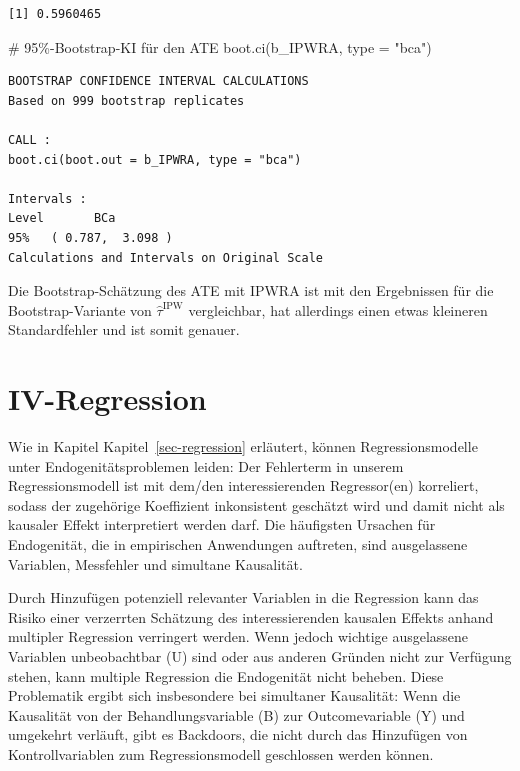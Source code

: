 \documentclass[
  a4paper,
  DIV=11,
  oneside]{scrreprt}
\newenvironment{Shaded}{\begin{snugshade}}{\end{snugshade}}
\newcommand{\AttributeTok}[1]{\textcolor[rgb]{0.40,0.45,0.13}{#1}}
\newcommand{\CommentTok}[1]{\textcolor[rgb]{0.37,0.37,0.37}{#1}}
\newcommand{\FunctionTok}[1]{\textcolor[rgb]{0.28,0.35,0.67}{#1}}
\newcommand{\NormalTok}[1]{\textcolor[rgb]{0.00,0.23,0.31}{#1}}
\newcommand{\StringTok}[1]{\textcolor[rgb]{0.13,0.47,0.30}{#1}}
\begin{document}
\begin{verbatim}
[1] 0.5960465
\end{verbatim}

\begin{Shaded}
\begin{Highlighting}[]
\CommentTok{\# 95\%{-}Bootstrap{-}KI für den ATE}
\FunctionTok{boot.ci}\NormalTok{(b\_IPWRA, }\AttributeTok{type =} \StringTok{"bca"}\NormalTok{)}
\end{Highlighting}
\end{Shaded}

\begin{verbatim}
BOOTSTRAP CONFIDENCE INTERVAL CALCULATIONS
Based on 999 bootstrap replicates

CALL : 
boot.ci(boot.out = b_IPWRA, type = "bca")

Intervals : 
Level       BCa          
95%   ( 0.787,  3.098 )  
Calculations and Intervals on Original Scale
\end{verbatim}

Die Bootstrap-Schätzung des ATE mit IPWRA ist mit den Ergebnissen für
die Bootstrap-Variante von \(\widehat{\tau}^\text{IPW}\) vergleichbar,
hat allerdings einen etwas kleineren Standardfehler und ist somit
genauer.


\chapter{IV-Regression}\label{iv-regression}

Wie in Kapitel Kapitel~\ref{sec-regression} erläutert, können
Regressionsmodelle unter Endogenitätsproblemen leiden: Der Fehlerterm in
unserem Regressionsmodell ist mit dem/den interessierenden Regressor(en)
korreliert, sodass der zugehörige Koeffizient inkonsistent geschätzt
wird und damit nicht als kausaler Effekt interpretiert werden darf. Die
häufigsten Ursachen für Endogenität, die in empirischen Anwendungen
auftreten, sind ausgelassene Variablen, Messfehler und simultane
Kausalität.

Durch Hinzufügen potenziell relevanter Variablen in die Regression kann
das Risiko einer verzerrten Schätzung des interessierenden kausalen
Effekts anhand multipler Regression verringert werden. Wenn jedoch
wichtige ausgelassene Variablen unbeobachtbar (U) sind oder aus anderen
Gründen nicht zur Verfügung stehen, kann multiple Regression die
Endogenität nicht beheben. Diese Problematik ergibt sich insbesondere
bei simultaner Kausalität: Wenn die Kausalität von der
Behandlungsvariable (B) zur Outcomevariable (Y) und umgekehrt verläuft,
gibt es Backdoors, die nicht durch das Hinzufügen von Kontrollvariablen
zum Regressionsmodell geschlossen werden können.
\end{document}
